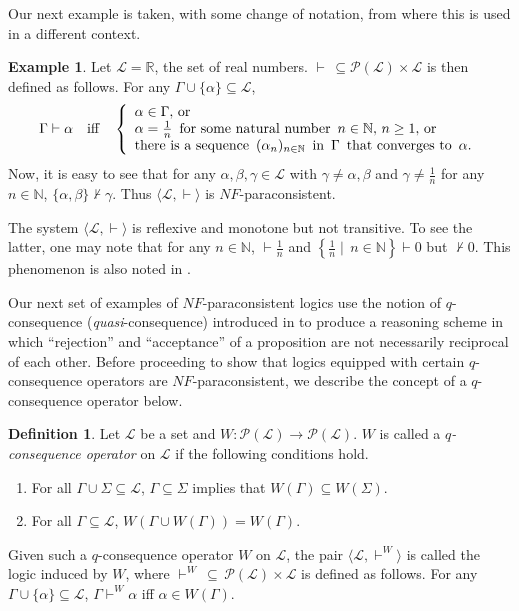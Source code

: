 \documentclass[submission]{eptcs}
\newcommand{\lang}{\mathcal{L}}
\newcommand{\pow}{\mathcal{P}}
\theoremstyle{definition}
\newtheorem{dfn}[thm]{Definition}
\newtheorem{exa}[thm]{Example}
\begin{document}
Our next example is taken, with some change of notation, from \cite{Carnielli2007} where this is used in a different context.

\begin{exa}
Let $\lang=\mathbb{R}$, the set of real numbers. $\vdash\,\subseteq\pow(\lang)\times\lang$ is then defined as follows. For any $\Gamma\cup\{\alpha\}\subseteq\lang$,
\[
\Gamma\vdash\alpha\quad\hbox{iff}\quad\left\{\begin{array}{l}
     \alpha\in\Gamma,\,\hbox{or}\\
     \alpha=\frac{1}{n}\,\hbox{ for some natural number }\,n\in\mathbb{N},\,n\ge1,\,\hbox{or}\\
     \hbox{there is a sequence }\,(\alpha_n)_{n\in\mathbb{N}}\,\hbox{ in }\,\Gamma\,\hbox{ that converges to }\,\alpha.
\end{array}\right.
\]
Now, it is easy to see that for any $\alpha,\beta,\gamma\in\lang$ with  $\gamma\neq\alpha,\beta$ and $\gamma\neq\frac{1}{n}$ for any $n\in\mathbb{N}$, $\{\alpha,\beta\}\not\vdash\gamma$. Thus $\langle\lang,\vdash\rangle$ is $NF$-paraconsistent.

The system $\langle\lang,\vdash\rangle$ is reflexive and monotone but not transitive. To see the latter, one may note that for any $n\in\mathbb{N}$, $\vdash\frac{1}{n}$ and $\left\{\frac{1}{n}\mid\,n\in\mathbb{N}\right\}\vdash0$ but $\not\vdash0$. This phenomenon is also noted in \cite{Carnielli2007}.
\end{exa}

Our next set of examples of $NF$-paraconsistent logics use the notion of $q$-consequence (\emph{quasi}-con\-se\-quence) introduced in \cite{Malinowski1990} to produce a reasoning scheme in which ``rejection'' and ``acceptance'' of a proposition are not necessarily reciprocal of each other. Before proceeding to show that logics equipped with certain $q$-consequence operators are $NF$-paraconsistent, we describe the concept of a $q$-consequence operator below.

\begin{dfn}\label{dfn:q-cons}
Let $\lang$ be a set and $W:\pow(\lang)\to\pow(\lang)$. $W$ is called a \emph{$q$-consequence operator} on $\lang$ if the following conditions hold.
\begin{enumerate}[label=(\roman*)]
    \item For all $\Gamma\cup\Sigma\subseteq\lang$, $\Gamma\subseteq\Sigma$ implies that $W(\Gamma)\subseteq W(\Sigma)$.
    \item For all $\Gamma\subseteq\lang$, $W(\Gamma\cup W(\Gamma))=W(\Gamma)$.
\end{enumerate}
Given such a $q$-consequence operator $W$ on $\lang$, the pair $\langle\lang,\vdash^W\rangle$ is called the logic induced by $W$, where $\vdash^W\,\subseteq\,\pow(\lang)\times\lang$ is defined as follows. For any $\Gamma\cup\{\alpha\}\subseteq\lang$, $\Gamma\vdash^W\alpha$ iff $\alpha\in W(\Gamma)$.
\end{dfn}
\end{document}
